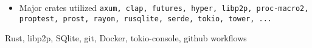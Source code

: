 \begin{experiences}
{\begin{itemize}
\begin{itemize}
                          \item SQlite based storage
                          \item JSON RPC server
                          \item Derive proc macros for easier P2P DTO generation
                          \item Patricia-Merkle-Tries traversal for proof generation
                          \item randomized fake block data generation for sync testing
                          \item RPC load tests
                        \end{itemize}
                        \item Major crates utilized \newline
                           \texttt{axum, clap, futures, hyper, libp2p, proc-macro2, proptest, prost, rayon, rusqlite, serde, tokio, tower, ...}
                      \end{itemize}
                    }
                    {Rust, libp2p, SQlite, git, Docker, tokio-console, github workflows}
  \emptySeparator


\end{experiences}
